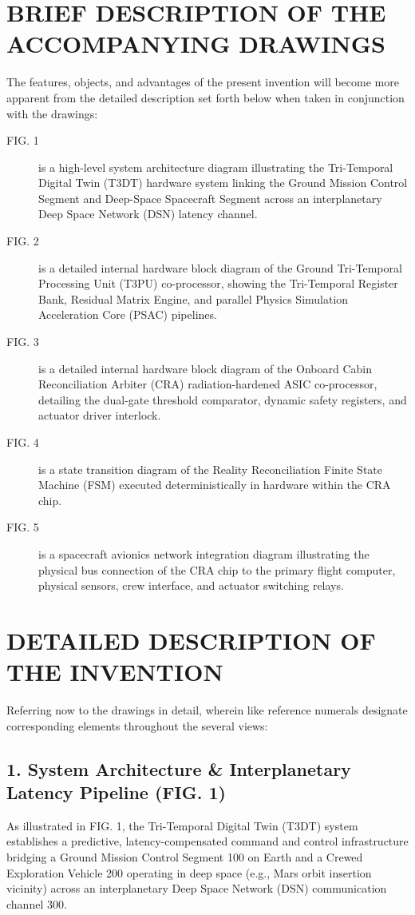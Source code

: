 \documentclass[12pt,a4paper]{article}
\begin{document}
\section*{BRIEF DESCRIPTION OF THE ACCOMPANYING DRAWINGS}
The features, objects, and advantages of the present invention will become more apparent from the detailed description set forth below when taken in conjunction with the drawings:
\begin{description}
    \item[FIG. 1] is a high-level system architecture diagram illustrating the Tri-Temporal Digital Twin (T3DT) hardware system linking the Ground Mission Control Segment and Deep-Space Spacecraft Segment across an interplanetary Deep Space Network (DSN) latency channel.
    \item[FIG. 2] is a detailed internal hardware block diagram of the Ground Tri-Temporal Processing Unit (T3PU) co-processor, showing the Tri-Temporal Register Bank, Residual Matrix Engine, and parallel Physics Simulation Acceleration Core (PSAC) pipelines.
    \item[FIG. 3] is a detailed internal hardware block diagram of the Onboard Cabin Reconciliation Arbiter (CRA) radiation-hardened ASIC co-processor, detailing the dual-gate threshold comparator, dynamic safety registers, and actuator driver interlock.
    \item[FIG. 4] is a state transition diagram of the Reality Reconciliation Finite State Machine (FSM) executed deterministically in hardware within the CRA chip.
    \item[FIG. 5] is a spacecraft avionics network integration diagram illustrating the physical bus connection of the CRA chip to the primary flight computer, physical sensors, crew interface, and actuator switching relays.
\end{description}

\section*{DETAILED DESCRIPTION OF THE INVENTION}
Referring now to the drawings in detail, wherein like reference numerals designate corresponding elements throughout the several views:

\subsection*{1. System Architecture \& Interplanetary Latency Pipeline (FIG. 1)}
As illustrated in FIG. 1, the Tri-Temporal Digital Twin (T3DT) system establishes a predictive, latency-compensated command and control infrastructure bridging a Ground Mission Control Segment 100 on Earth and a Crewed Exploration Vehicle 200 operating in deep space (e.g., Mars orbit insertion vicinity) across an interplanetary Deep Space Network (DSN) communication channel 300.
\end{document}

